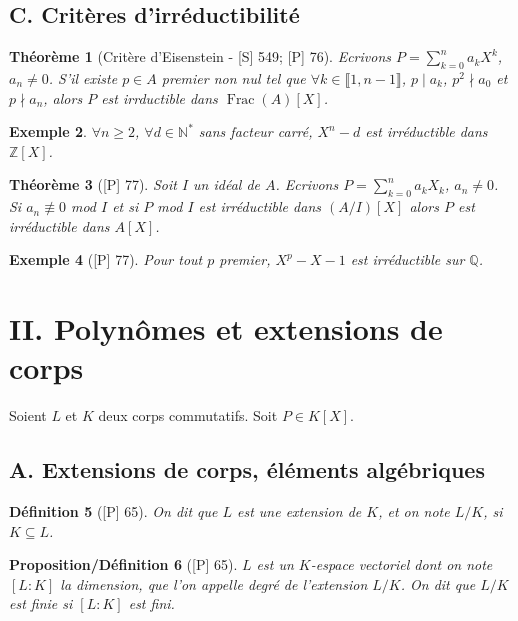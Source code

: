 \documentclass[10pt, a4paper, parskip=full, twoside, twocolumn]{report}
\newtheorem{definition}{Définition}
\newtheorem{theorem}[definition]{Théorème}
\newtheorem{proposition_def}[definition]{Proposition/Définition}
\newtheorem{example}[definition]{Exemple}
\newcommand{\IN}{\mathbb{N}}
\newcommand{\IZ}{\mathbb{Z}}
\newcommand{\IQ}{\mathbb{Q}}
\DeclareMathOperator{\Frac}{Frac}
\begin{document}
\subsection*{C. Critères d'irréductibilité}

\begin{theorem}[Critère d'Eisenstein - \textnormal{[S] 549; [P] 76}]
	Ecrivons $P=\sum_{k=0}^{n} a_kX^k$, $a_n \neq 0$.
	S'il existe $p\in A$ premier non nul tel que $\forall k\in \llbracket 1,n-1\rrbracket$, $p\mid a_k$, $p^2 \nmid a_0$ et $p\nmid a_n$, alors $P$ est irrductible dans $\Frac(A)[X]$.
\end{theorem}

\begin{example}
	$\forall n\geq 2$, $\forall d\in\IN^*$ sans facteur carré, $X^n - d$ est irréductible dans $\IZ[X]$.
\end{example}

\begin{theorem}[\textnormal{[P] 77}]
	Soit $I$ un idéal de $A$. Ecrivons $P = \sum_{k=0}^{n} a_kX_k$, $a_n\neq 0$.
	Si $a_n \not\equiv 0$ mod $I$ et si $P$ mod $I$ est irréductible dans $\left(A/I\right)[X]$ alors
	$P$ est irréductible dans $A[X]$.
\end{theorem}

\begin{example}[\textnormal{[P] 77}]
	Pour tout $p$ premier, $X^p-X-1$ est irréductible sur $\IQ$.
\end{example}

\section*{II. Polynômes et extensions de corps}
\textcolor{paragraphtext}{Soient $L$ et $K$ deux corps commutatifs. Soit $P\in K[X]$.}

\subsection*{A. Extensions de corps, éléments algébriques}
\begin{definition}[\textnormal{[P] 65}]
	On dit que $L$ est \emph{une extension de $K$}, et on note $L/K$, si $K\subseteq L$.
\end{definition}

\begin{proposition_def}[\textnormal{[P] 65}]
	$L$ est un $K$-espace vectoriel dont on note $[L:K]$ la dimension, que l'on appelle \emph{degré de l'extension $L/K$}.
	On dit que $L/K$ est finie si $[L:K]$ est fini.
\end{proposition_def}
\end{document}
